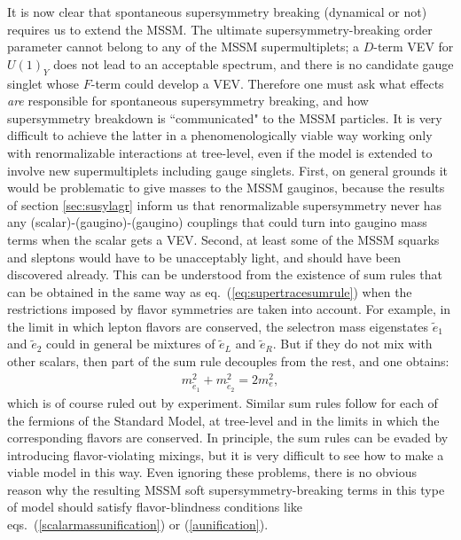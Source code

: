 \documentclass[12pt]{article}
\def\beq{\begin{eqnarray}}
\def\eeq{\end{eqnarray}}
\begin{document}
It is now clear that spontaneous supersymmetry breaking (dynamical or not)
requires us to extend the MSSM. The ultimate supersymmetry-breaking order
parameter cannot belong to any of the MSSM supermultiplets; a $D$-term VEV
for $U(1)_Y$ does not lead to an acceptable spectrum, and there is no
candidate gauge singlet whose $F$-term could develop a VEV. Therefore one
must ask what effects {\it are} responsible for spontaneous supersymmetry
breaking, and how supersymmetry breakdown is ``communicated" to the MSSM
particles.  It is very difficult to achieve the latter in a
phenomenologically viable way working only with renormalizable
interactions at tree-level, even if the model is extended to involve new
supermultiplets including gauge singlets. First, on general grounds it 
would be
problematic to give masses to the MSSM gauginos, because the results of
section \ref{sec:susylagr} inform us that renormalizable supersymmetry
never has any (scalar)-(gaugino)-(gaugino) couplings that could turn into
gaugino mass terms when the scalar gets a VEV.  Second, at least some of
the MSSM squarks and sleptons would have to be unacceptably light, and
should have been discovered already. This can be understood from the
existence of sum rules that can be obtained in the same way as
eq.~(\ref{eq:supertracesumrule}) when the restrictions imposed by flavor
symmetries are taken into account. For example, in the limit in which
lepton flavors are conserved, the selectron mass eigenstates $\tilde e_1$
and $\tilde e_2$ could in general be mixtures of $\tilde e_L$ and $\tilde
e_R$. But if they do not mix with other scalars, then part of the sum rule
decouples from the rest, and one obtains:
\beq
m_{\tilde e_1}^2 + m_{\tilde e_2}^2 = 2 m_e^2,
\label{eq:sumrulee}
\eeq
which is of course ruled out by experiment. Similar sum rules follow for
each of the fermions of the Standard Model, at tree-level and in the
limits in which the corresponding flavors are conserved. In principle, the
sum rules can be evaded by introducing flavor-violating mixings, but it is
very difficult to see how to make a viable model in this way.  Even
ignoring these problems, there is no obvious reason why the resulting MSSM
soft supersymmetry-breaking terms in this type of model should satisfy
flavor-blindness conditions like eqs.~(\ref{scalarmassunification}) or
(\ref{aunification}).
\end{document}
